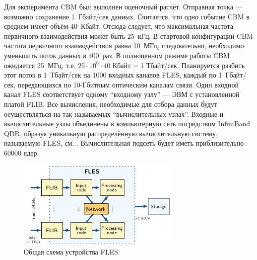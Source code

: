 Для эксперимента CBM был выполнен оценочный расчёт. Отправная точка --- возможно сохранение 1~Гбайт/сек данных. Считается, что одно событие CBM в среднем имеет объём 40~Кбайт. Отсюда следует, что максимальная частота первичного взаимодействия может быть 25~кГц. В стартовой конфигурации CBM частота первичного взаимодействия равна 10~МГц, следовательно, необходимо уменьшить поток данных в 400~раз. В полноценном режиме работы CBM ожидается 25~МГц, т.е. $ 25 \cdot 10^{6} \cdot 40 $ Кбайт = 1 Тбайт/сек. Планируется разбить этот поток в 1~Тбайт/сек на 1000 входных каналов FLES, каждый по 1~Гбайт/сек, передающихся по 10-Гбитным оптическим каналам связи. Один входной канал FLES соответствует одному ``входному узлу'' --- ЭВМ с установленной платой FLIB. Все вычисления, необходимые для отбора данных будут осуществляться на так называемых ``вычислительных узлах''. Входные и вычислительные узлы объединены в компьютерную сеть посредством InfiniBand QDR, образуя уникальную распределённую вычислительную систему, называемую FLES, см. . Вычислительная подсеть будет иметь приблизительно 60000 ядер.

\begin{figure}[H]
\centering
\includegraphics[width=0.7\textwidth]{pictures/FLESarch.png}
\caption{Общая схема устройства FLES.}
\label{fig:FLESarch}
\end{figure}


